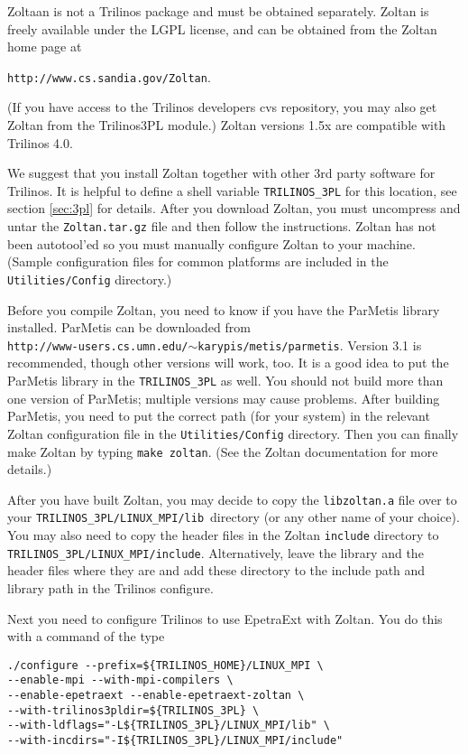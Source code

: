 Zoltaan is not a Trilinos package and must be obtained separately.
Zoltan is freely available under the LGPL license, and can
be obtained from the Zoltan home page at 

\texttt{http://www.cs.sandia.gov/Zoltan}. 

(If you have access to the Trilinos developers cvs repository, you may
also get Zoltan from the Trilinos3PL module.)  Zoltan versions 1.5x are
compatible with Trilinos 4.0.

We suggest that you install Zoltan together with other 3rd party software 
for Trilinos. It is helpful to define a shell variable \verb!TRILINOS_3PL! 
for this location, see section \ref{sec:3pl} for details. After 
you download Zoltan, you must uncompress and untar the
\verb!Zoltan.tar.gz! file and then follow the instructions. 
Zoltan has not been autotool'ed so you must manually configure
Zoltan to your machine. (Sample configuration files for common
platforms are included in the \verb!Utilities/Config! directory.) 

Before you compile Zoltan, you need to know if you have the ParMetis
library installed.  ParMetis can be downloaded from \\
\texttt{http://www-users.cs.umn.edu/$\sim$karypis/metis/parmetis}.
Version 3.1 is recommended, though other versions will work, too.  It is
a good idea to put the ParMetis library in the \verb!TRILINOS_3PL!  as
well. You should not build more than one version of ParMetis; multiple
versions may cause problems. After building ParMetis, you need to put
the correct path (for your system) in the relevant Zoltan configuration
file in the \verb!Utilities/Config! directory. Then you can finally make
Zoltan by typing \verb!make zoltan!. (See the Zoltan documentation for
more details.)

After you have built Zoltan, you may decide to copy the
\verb!libzoltan.a! file over to your
\verb!TRILINOS_3PL/LINUX_MPI/lib!~directory (or any other name of your
choice). You may also need to copy
the header files in the Zoltan \verb!include! directory to \\
\verb!TRILINOS_3PL/LINUX_MPI/include!.  Alternatively, leave the library
and the header files where they are and add these directory to the
include path and library path in the Trilinos configure.

Next you need to configure Trilinos to use EpetraExt with Zoltan.
You do this with a command of the type
\begin{verbatim}
./configure --prefix=${TRILINOS_HOME}/LINUX_MPI \
--enable-mpi --with-mpi-compilers \
--enable-epetraext --enable-epetraext-zoltan \
--with-trilinos3pldir=${TRILINOS_3PL} \
--with-ldflags="-L${TRILINOS_3PL}/LINUX_MPI/lib" \
--with-incdirs="-I${TRILINOS_3PL}/LINUX_MPI/include"
\end{verbatim}

